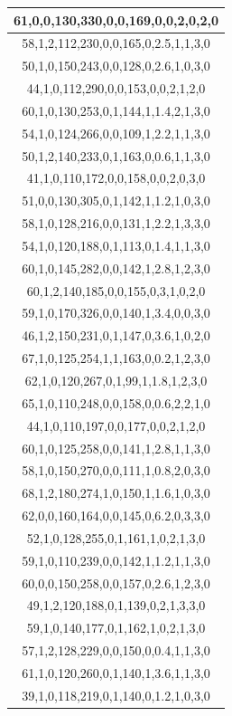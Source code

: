 \documentclass{article}
\begin{document}
\begin{table}[h!]
\begin{tabular}{|c|}
61,0,0,130,330,0,0,169,0,0,2,0,2,0 \\ \hline
58,1,2,112,230,0,0,165,0,2.5,1,1,3,0 \\ \hline
50,1,0,150,243,0,0,128,0,2.6,1,0,3,0 \\ \hline
44,1,0,112,290,0,0,153,0,0,2,1,2,0 \\ \hline
60,1,0,130,253,0,1,144,1,1.4,2,1,3,0 \\ \hline
54,1,0,124,266,0,0,109,1,2.2,1,1,3,0 \\ \hline
50,1,2,140,233,0,1,163,0,0.6,1,1,3,0 \\ \hline
41,1,0,110,172,0,0,158,0,0,2,0,3,0 \\ \hline
51,0,0,130,305,0,1,142,1,1.2,1,0,3,0 \\ \hline
58,1,0,128,216,0,0,131,1,2.2,1,3,3,0 \\ \hline
54,1,0,120,188,0,1,113,0,1.4,1,1,3,0 \\ \hline
60,1,0,145,282,0,0,142,1,2.8,1,2,3,0 \\ \hline
60,1,2,140,185,0,0,155,0,3,1,0,2,0 \\ \hline
59,1,0,170,326,0,0,140,1,3.4,0,0,3,0 \\ \hline
46,1,2,150,231,0,1,147,0,3.6,1,0,2,0 \\ \hline
67,1,0,125,254,1,1,163,0,0.2,1,2,3,0 \\ \hline
62,1,0,120,267,0,1,99,1,1.8,1,2,3,0 \\ \hline
65,1,0,110,248,0,0,158,0,0.6,2,2,1,0 \\ \hline
44,1,0,110,197,0,0,177,0,0,2,1,2,0 \\ \hline
60,1,0,125,258,0,0,141,1,2.8,1,1,3,0 \\ \hline
58,1,0,150,270,0,0,111,1,0.8,2,0,3,0 \\ \hline
68,1,2,180,274,1,0,150,1,1.6,1,0,3,0 \\ \hline
62,0,0,160,164,0,0,145,0,6.2,0,3,3,0 \\ \hline
52,1,0,128,255,0,1,161,1,0,2,1,3,0 \\ \hline
59,1,0,110,239,0,0,142,1,1.2,1,1,3,0 \\ \hline
60,0,0,150,258,0,0,157,0,2.6,1,2,3,0 \\ \hline
49,1,2,120,188,0,1,139,0,2,1,3,3,0 \\ \hline
59,1,0,140,177,0,1,162,1,0,2,1,3,0 \\ \hline
57,1,2,128,229,0,0,150,0,0.4,1,1,3,0 \\ \hline
61,1,0,120,260,0,1,140,1,3.6,1,1,3,0 \\ \hline
39,1,0,118,219,0,1,140,0,1.2,1,0,3,0 \\ \hline

\end{tabular}
\end{table}
\end{document}
